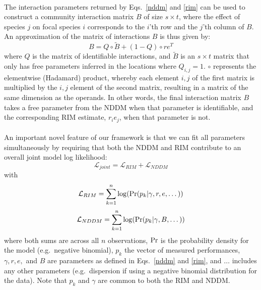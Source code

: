 \documentclass[a4,12pt]{article}
\begin{document}
\begin{refsection}
    \paragraph{}
    The interaction parameters returned by Eqs.~\ref{nddm} and \ref{rim} can be used to construct a community interaction matrix $B$ of size $s \times t$, where the effect of species $j$ on focal species $i$ corresponds to the $i$'th row and the $j$'th column of $B$. An approximation of the matrix of interactions $B$ is thus given by:
        \begin{equation}
        B = Q \circ \tilde B + (1 - Q) \circ r e^T
        \label{matB}
        \end{equation}
    where $Q$ is the matrix of identifiable interactions, and $\tilde B$ is an $s \times t$ matrix that only has free parameters inferred in the locations where $Q_{i, j} =1$. $\circ$ represents the elementwise (Hadamard) product, whereby each element $i, j$ of the first matrix is multiplied by the $i, j$ element of the second matrix, resulting in a matrix of the same dimension as the operands. In other words, the final interaction matrix $B$ takes a free parameter from the NDDM when that parameter is identifiable, and the corresponding RIM estimate, $r_i e_j$, when that parameter is not.

    \paragraph{}
    An important novel feature of our framework is that we can fit all parameters simultaneously by requiring that both the NDDM and RIM contribute to an overall joint model log likelihood:
         \begin{equation}
        \mathcal{L}_{joint} = \mathcal{L}_{RIM} + \mathcal{L}_{NDDM}
        \label{loglikjoint}
        \end{equation}
    with
        \begin{equation}
        \mathcal{L}_{RIM} = \sum_{k=1}^{n} \log ({\rm Pr} (p_k | \gamma, r, e, \dots))
        \label{logrim}
        \end{equation}
        \begin{equation}
        \mathcal{L}_{NDDM} = \sum_{k=1}^{n} \log ({\rm Pr} (p_k | \gamma, B, \dots))
        \label{lognddm}
        \end{equation}
    where both sums are across all $n$ observations, ${\rm Pr}$ is the probability density for the model (e.g.\ negative binomial), $p_k$ the vector of measured performances, $\gamma, r, e,$ and $B$ are parameters as defined in Eqs.~\ref{nddm} and \ref{rim}, and $\dots$ includes any other parameters (e.g.\ dispersion if using a negative binomial distribution for the data). Note that $p_k$ and $\gamma$ are common to both the RIM and NDDM.


\end{refsection}
\end{document}
